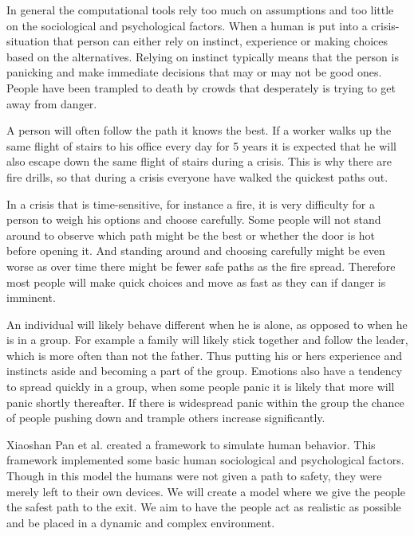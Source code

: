 In general the computational tools rely too much on assumptions and too little on the sociological and psychological  
factors. When a human is put into a crisis-situation that person can either rely on instinct, experience or making  
choices based on the alternatives. Relying on instinct typically means that the person is panicking and make immediate  
decisions that may or may not be good ones. People have been trampled to death by crowds that desperately is trying  
to get away from danger. 
 
A person will often follow the path it knows the best. If a worker walks up the same flight of stairs to his office  
every day for 5 years it is expected that he will also escape down the same flight of stairs during a crisis. This  
is why there are fire drills, so that during a crisis everyone have walked the quickest paths out. 
 
In a crisis that is time-sensitive, for instance a fire, it is very difficulty for a person to weigh his options and  
choose carefully. Some people will not stand around to observe which path might be the best or whether the  
door is hot before opening it. And standing around and choosing carefully might be even worse as  
over time there might be fewer safe paths as the fire spread. Therefore most people will make quick choices 
and move as fast as they can if danger is imminent. 
 
An individual will likely behave different when he is alone, as opposed to when he is in a group. For example  
a family will likely stick together and follow the leader, which is more often than not the father. Thus putting  
his or hers experience and instincts aside and becoming a part of the group. Emotions also have a tendency  
to spread quickly in a group, when some people panic it is likely that more will panic shortly thereafter. If  
there is widespread panic within the group the chance of people pushing down and trample others increase  
significantly. 
 
Xiaoshan Pan et al.\cite{Pan:2007} created a framework to simulate human behavior. This framework implemented some 
basic human sociological and psychological factors. Though in this model the humans were not given a path 
to safety, they were merely left to their own devices. We will create a model where we give the people the 
safest path to the exit. We aim to have the people act as realistic as possible and be placed in a dynamic 
and complex environment.
 
 
